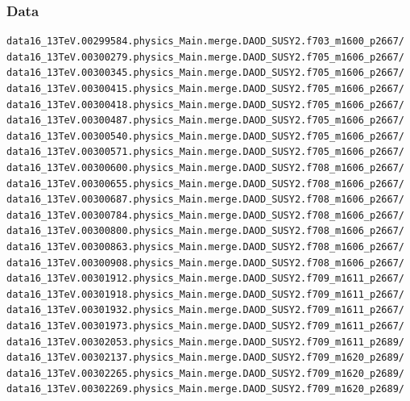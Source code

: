 \documentclass[mathserif,serif]{beamer}
\begin{document}
\begin{frame}[fragile]
\frametitle{Data}
\tiny
\begin{verbatim}
data16_13TeV.00299584.physics_Main.merge.DAOD_SUSY2.f703_m1600_p2667/
data16_13TeV.00300279.physics_Main.merge.DAOD_SUSY2.f705_m1606_p2667/
data16_13TeV.00300345.physics_Main.merge.DAOD_SUSY2.f705_m1606_p2667/
data16_13TeV.00300415.physics_Main.merge.DAOD_SUSY2.f705_m1606_p2667/
data16_13TeV.00300418.physics_Main.merge.DAOD_SUSY2.f705_m1606_p2667/
data16_13TeV.00300487.physics_Main.merge.DAOD_SUSY2.f705_m1606_p2667/
data16_13TeV.00300540.physics_Main.merge.DAOD_SUSY2.f705_m1606_p2667/
data16_13TeV.00300571.physics_Main.merge.DAOD_SUSY2.f705_m1606_p2667/
data16_13TeV.00300600.physics_Main.merge.DAOD_SUSY2.f708_m1606_p2667/
data16_13TeV.00300655.physics_Main.merge.DAOD_SUSY2.f708_m1606_p2667/
data16_13TeV.00300687.physics_Main.merge.DAOD_SUSY2.f708_m1606_p2667/
data16_13TeV.00300784.physics_Main.merge.DAOD_SUSY2.f708_m1606_p2667/
data16_13TeV.00300800.physics_Main.merge.DAOD_SUSY2.f708_m1606_p2667/
data16_13TeV.00300863.physics_Main.merge.DAOD_SUSY2.f708_m1606_p2667/
data16_13TeV.00300908.physics_Main.merge.DAOD_SUSY2.f708_m1606_p2667/
data16_13TeV.00301912.physics_Main.merge.DAOD_SUSY2.f709_m1611_p2667/
data16_13TeV.00301918.physics_Main.merge.DAOD_SUSY2.f709_m1611_p2667/
data16_13TeV.00301932.physics_Main.merge.DAOD_SUSY2.f709_m1611_p2667/
data16_13TeV.00301973.physics_Main.merge.DAOD_SUSY2.f709_m1611_p2667/
data16_13TeV.00302053.physics_Main.merge.DAOD_SUSY2.f709_m1611_p2689/
data16_13TeV.00302137.physics_Main.merge.DAOD_SUSY2.f709_m1620_p2689/
data16_13TeV.00302265.physics_Main.merge.DAOD_SUSY2.f709_m1620_p2689/
data16_13TeV.00302269.physics_Main.merge.DAOD_SUSY2.f709_m1620_p2689/
\end{verbatim}
\end{frame}
\end{document}
